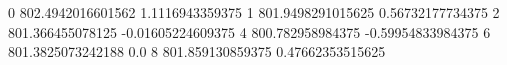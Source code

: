 0 802.4942016601562 1.1116943359375
1 801.9498291015625 0.56732177734375
2 801.366455078125 -0.01605224609375
4 800.782958984375 -0.59954833984375
6 801.3825073242188 0.0
8 801.859130859375 0.47662353515625
